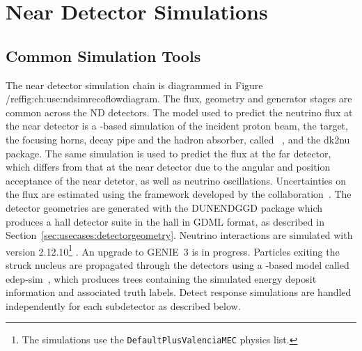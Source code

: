 \documentclass[../main-v1.tex]{subfiles}
\begin{document}
\section{Near Detector Simulations}\label{ch:use:nd}


\subsection{Common Simulation Tools}

The near detector simulation chain is diagrammed in Figure /ref{fig:ch:use:ndsimrecoflowdiagram}. The flux, geometry and generator stages are common across the ND detectors. 
The model used to predict the neutrino flux at the near detector is a -based simulation of the incident proton beam, the target, the focusing horns, decay pipe and the hadron absorber, called ~\cite{DUNE:2020ypp}, and the dk2nu package.  The same simulation is used to predict the flux at the far detector, which differs from that at the near detector due to the angular and position acceptance of the near detetor, as well as neutrino oscillations.  Uncertainties on the flux are estimated using the  framework developed by the  collaboration~\cite{Aliaga:2016oaz,AliagaSoplin:2016shs}.
The detector geometries are generated with the DUNENDGGD package which produces a hall detector suite in the hall in GDML format, as described in Section~\ref{sec:usecases:detectorgeometry}. Neutrino interactions are simulated with  version 2.12.10\footnote{The simulations use the \texttt{DefaultPlusValenciaMEC} physics list.} \cite{Andreopoulos:2009rq}. An upgrade to GENIE~3 is in progress. Particles exiting the struck nucleus are propagated through the detectors using a -based model called edep-sim~\cite{ref:edep-sim}, which produces  trees containing the simulated energy deposit information and associated truth labels. Detect response simulations are handled independently for each subdetector as described below. 
\end{document}
